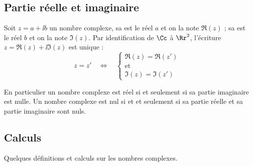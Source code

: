 \documentclass[class=report,crop=false]{standalone}
\begin{document}
\subsection{Partie réelle et imaginaire}

Soit $z = a + \ii b$ un nombre complexe, sa  est le réel $a$ et on
la note $\Re(z)$ ;
sa  est le réel $b$ et on la note $\Im(z)$.
Par identification de $\Cc$ \`a $\Rr^2$,
l'écriture $z = \Re(z) + \ii  \Im(z)$
est unique :
\[ z = z' \quad \Longleftrightarrow \quad \left\{ \begin{array}{c}
     \Re (z) = \Re (z')\\
     \text{et}\\
     \Im (z) = \Im (z')
   \end{array} \right. \]

En particulier un nombre complexe est réel si et seulement si sa partie imaginaire
est nulle. Un nombre complexe est nul si et et seulement si sa partie réelle et sa partie imaginaire sont nuls.

\subsection{Calculs}

Quelques définitions et calculs sur les nombres complexes.
\end{document}
